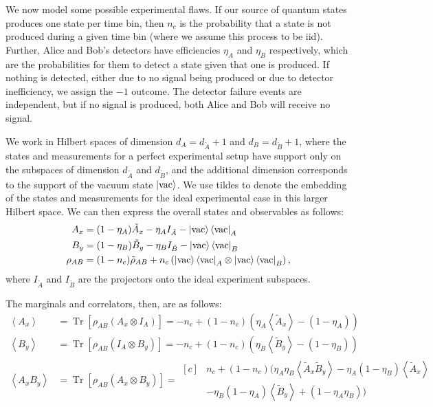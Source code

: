 \documentclass[10pt, a4paper]{article}
\numberwithin{equation}{section} %
\theoremstyle{definition}
\theoremstyle{plain}
\newcommand{\?}{\mathrel{?}} %
\newcommand{\angleb}[1]{\left\langle #1 \right\rangle} %
\newcommand{\Tr}[2][]{\mathop{\mathrm{Tr}#1}\left[ #2 \right]} %
\begin{document}
            We now model some possible experimental flaws. If our source of quantum states produces one state per time bin, then \(n_c\) is the probability that a state is not produced during a given time bin (where we assume this process to be iid). Further, Alice and Bob's detectors have efficiencies \(\eta_A\) and \(\eta_B\) respectively, which are the probabilities for them to detect a state given that one is produced. If nothing is detected, either due to no signal being produced or due to detector inefficiency, we assign the \(-1\) outcome. The detector failure events are independent, but if no signal is produced, both Alice and Bob will receive no signal.

            We work in Hilbert spaces of dimension \(d_{A} = d_{\tilde{A}} + 1\) and \(d_{B} = d_{\tilde{B}} + 1\), where the states and measurements for a perfect experimental setup have support only on the subspaces of dimension \(d_{\tilde{A}}\) and \(d_{\tilde{B}}\), and the additional dimension corresponds to the support of the vacuum state \(\ket{\rm vac}\). We use tildes to denote the embedding of the states and measurements for the ideal experimental case in this larger Hilbert space. We can then express the overall states and observables as follows:
            \begin{align*}
              A_x &= (1-\eta_A)\tilde{A}_x - \eta_A I_{\tilde{A}} - \ket{\rm vac}\bra{\rm vac}_{A} \\
              B_y &= (1-\eta_B)\tilde{B}_y - \eta_B I_{\tilde{B}} - \ket{\rm vac}\bra{\rm vac}_{B} \\
              \rho_{AB} &= (1-n_c)\tilde{\rho}_{AB} + n_c \left( \ket{\rm vac}\bra{\rm vac}_{A} \otimes \ket{\rm vac}\bra{\rm vac}_{B} \right),
            \end{align*}
            where \(I_{\tilde{A}}\) and \(I_{\tilde{B}}\) are the projectors onto the ideal experiment subspaces.

            The marginals and correlators, then, are as follows:
            \begin{align*}
              \angleb{A_x} &= \Tr{\rho_{AB} \left( A_x \otimes I_A \right)} = -n_c + (1-n_c)(\eta_A\angleb{\tilde{A}_x} - (1-\eta_A)) \\
              \angleb{B_y} &= \Tr{\rho_{AB} \left( I_A \otimes B_y \right)} = -n_c + (1-n_c)(\eta_B\angleb{\tilde{B}_y} - (1-\eta_B)) \\
              \angleb{A_x B_y} &= \Tr{\rho_{AB} \left( A_x \otimes B_y \right)} = \begin{aligned}[c]
      & n_c + (1-n_c)(\eta_A\eta_B\angleb{\tilde{A}_x\tilde{B}_y} - \eta_A(1-\eta_B)\angleb{\tilde{A}_x} \\
      & -\eta_B(1-\eta_A)\angleb{\tilde{B}_y} + (1-\eta_A\eta_B) )
              \end{aligned}
              \end{align*}
\end{document}
